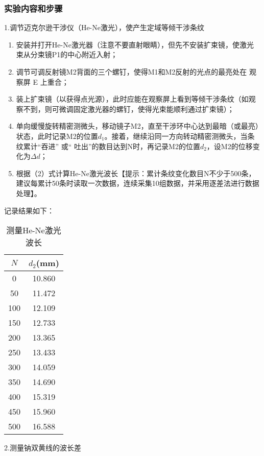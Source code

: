 \documentclass[dvipsnames, svgnames,a4paper,11pt]{article}
\begin{document}
\subsubsection{实验内容和步骤}
1.调节迈克尔逊干涉仪（He-Ne激光），使产生定域等倾干涉条纹
\begin{enumerate}
	\item 安装并打开He-Ne激光器（注意不要直射眼睛），但先不安装扩束镜，使激光 束从分束镜P1的中心附近入射；
	\item 调节可调反射镜M2背面的三个螺钉，使得M1和M2反射的光点的最亮处在 观察屏 E 上重合；
	\item 装上扩束镜（以获得点光源），此时应能在观察屏上看到等倾干涉条纹（如观 察不到，则可微调固定激光器的螺钉，使得光束能顺利通过扩束镜）；
	\item 单向缓慢旋转精密测微头，移动镜子M2，直至干涉环中心达到最暗（或最亮）状态，此时记录M2的位置$d_1$。接着，继续沿同一方向转动精密测微头，当条纹累计“吞进” 或“ 吐出”的数目达到N时，再记录M2的位置$d_2$，设M2的位移变化为$\Delta d$；
	\item 根据（2）式计算He-Ne激光波长【提示：累计条纹变化数目N不少于500条，建议每累计50条时读取一次数据，连续采集10组数据，并采用逐差法进行数据处理】。
\end{enumerate}
记录结果如下：
\begin{table}[H]
	\centering
	\caption{测量He-Ne激光波长}
	\begin{tabular}{cc}
		\toprule
		$N$&$d_2$(mm)\\
		\midrule
		0&10.860\\
		50&11.472\\
		100&12.109\\
		150&12.733\\
		200&13.365\\
		250&13.433\\
		300&14.059\\
		350&14.690\\
		400&15.319\\
		450&15.960\\
		500&16.588\\
		\toprule
	\end{tabular}
\end{table}
2.测量钠双黄线的波长差
\end{document}
